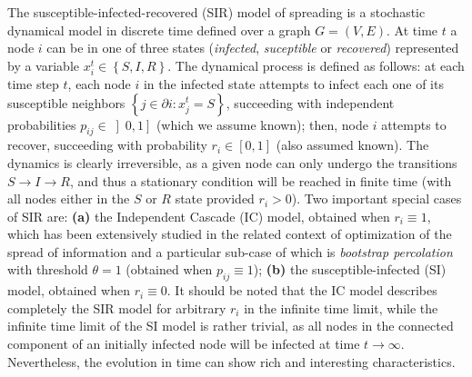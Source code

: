 The susceptible-infected-recovered (SIR) model of spreading is a stochastic dynamical model in discrete time defined over a graph $G=(V,E)$. At time $t$ a node $i$ can be in one of three states (\emph{infected}, \emph{suceptible} or \emph{recovered}) represented by a variable $x_{i}^{t}\in\left\{ S,I,R\right\} $.
The dynamical process is defined as follows: at each time step $t$, each node $i$ in the infected state attempts to infect each one of its susceptible neighbors $\left\{ j\in\partial i:x_{j}^{t}=S\right\}$, succeeding with independent probabilities $p_{ij}\in\left]0,1\right]$ (which we assume known); then, node $i$ attempts to recover, succeeding with probability $r_{i}\in\left[0,1\right]$ (also assumed known).
The dynamics is clearly irreversible, as a given node can only undergo the transitions $S\to I\to R$, and thus a stationary condition will be reached in finite time (with all nodes either in the $S$ or $R$ state provided $r_{i}>0$).
Two important special cases of SIR are: \textbf{(a)} the Independent Cascade (IC) model, obtained when $r_{i}\equiv1$, which has been extensively studied in the related context of optimization of the spread of information \cite{kempe_maximizing_2003} and a particular sub-case of which is {\em bootstrap percolation} with threshold $\theta = 1$ (obtained when $p_{ij}\equiv 1$);
\textbf{(b)} the susceptible-infected (SI) model, obtained when $r_{i}\equiv0$. It should be noted that the IC model describes completely the SIR model for arbitrary $r_{i}$ in the infinite time limit, while the infinite time limit of the SI model is rather trivial, as all nodes in the connected component of an initially infected node will be infected at time $t\to\infty$. Nevertheless, the evolution in time can show rich and interesting characteristics.


